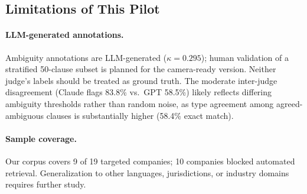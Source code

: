 \subsection{Limitations of This Pilot}

\paragraph{LLM-generated annotations.}
Ambiguity annotations are LLM-generated ($\kappa = 0.295$); human validation of a stratified 50-clause subset is planned for the camera-ready version. Neither judge's labels should be treated as ground truth. The moderate inter-judge disagreement (Claude flags 83.8\% vs.\ GPT 58.5\%) likely reflects differing ambiguity thresholds rather than random noise, as type agreement among agreed-ambiguous clauses is substantially higher (58.4\% exact match).

\paragraph{Sample coverage.}
Our corpus covers 9 of 19 targeted companies; 10 companies blocked automated retrieval. Generalization to other languages, jurisdictions, or industry domains requires further study.
